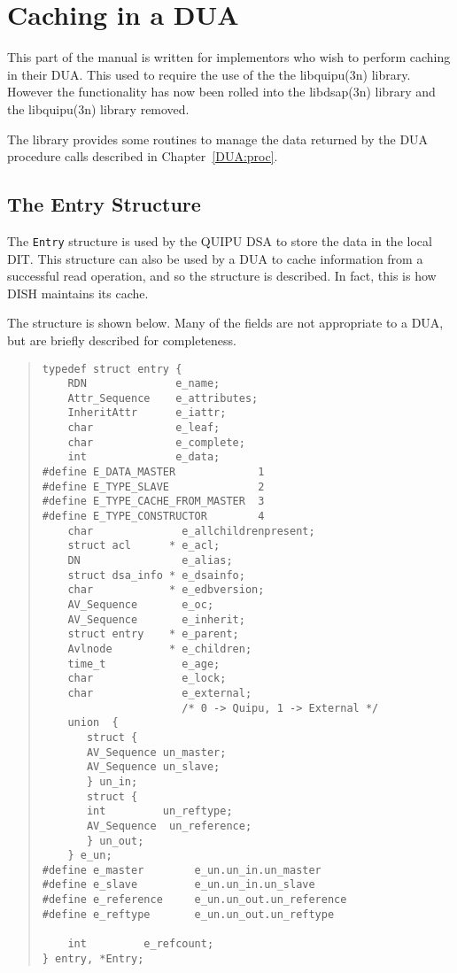 
\chapter {Caching in a DUA}

This part of the manual is written for implementors who wish to
perform caching in their DUA.  This used to require the use of the
the \man libquipu(3n) library.  However the functionality has now been
rolled into the \man libdsap(3n) library and the \man libquipu(3n) 
library removed.

The library provides some routines to manage the data returned by the DUA
procedure calls described in Chapter~\ref{DUA:proc}.


\section{The Entry Structure}

The \verb"Entry" structure is used by the QUIPU DSA to store the data
in the local DIT.  
This structure can also be used by a DUA to cache information from a
successful read operation, and so the structure is described.
In fact, this is how DISH maintains its cache.

The structure is shown below.
Many of the fields are not appropriate to a DUA, but are briefly described for
completeness.

\begin{quote}\small\begin{verbatim}
typedef struct entry {
    RDN              e_name;
    Attr_Sequence    e_attributes; 
    InheritAttr      e_iattr;
    char             e_leaf;         
    char             e_complete;     
    int              e_data;         
#define E_DATA_MASTER             1
#define E_TYPE_SLAVE              2
#define E_TYPE_CACHE_FROM_MASTER  3
#define E_TYPE_CONSTRUCTOR        4
    char              e_allchildrenpresent;
    struct acl      * e_acl;         
    DN                e_alias;        
    struct dsa_info * e_dsainfo; 
    char            * e_edbversion;
    AV_Sequence       e_oc;
    AV_Sequence       e_inherit;
    struct entry    * e_parent;
    Avlnode         * e_children;
    time_t            e_age;
    char              e_lock;         
    char              e_external;  
                      /* 0 -> Quipu, 1 -> External */
    union  {
       struct {
       AV_Sequence un_master;
       AV_Sequence un_slave;
       } un_in;
       struct {
       int         un_reftype;
       AV_Sequence  un_reference;
       } un_out;
    } e_un;
#define e_master        e_un.un_in.un_master
#define e_slave         e_un.un_in.un_slave
#define e_reference     e_un.un_out.un_reference
#define e_reftype       e_un.un_out.un_reftype

    int         e_refcount;
} entry, *Entry;
\end{verbatim}\end{quote}

